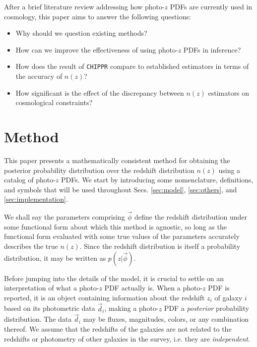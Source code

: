 \documentclass[iop]{emulateapj}
\newcommand{\chippr}{\texttt{CHIPPR} }
\begin{document}
After a brief literature review addressing how photo-$z$ PDFs are currently 
used in cosmology, this paper aims to answer the following questions:

\begin{itemize}
	\item Why should we question existing methods?
	\item How can we improve the effectiveness of using photo-$z$ PDFs in 
inference?
	\item How does the result of \chippr compare to established estimators 
in terms of the accuracy of $n(z)$?
	\item How significant is the effect of the discrepancy between $n(z)$ 
estimators on cosmological constraints?
\end{itemize}

\section{Method}
\label{sec:method}

This paper presents a mathematically consistent method for obtaining the 
posterior probability distribution over the redshift distribution $n(z)$ using 
a catalog of photo-$z$ PDFs.  We start by introducing some nomenclature, 
definitions, and symbols that will be used throughout Secs. \ref{sec:model}, 
\ref{sec:others}, and \ref{sec:implementation}.

We shall say the parameters comprising $\vec{\phi}$ define the redshift 
distribution under some functional form about which this method is agnostic, so 
long as the functional form evaluated with some true values of the parameters 
accurately describes the true $n(z)$.  Since the redshift distribution is 
itself a probability distribution, it may be written as $p(z | \vec{\phi})$.

Before jumping into the details of the model, it is crucial to settle on an 
interpretation of what a photo-$z$ PDF actually is.  When a photo-$z$ PDF is 
reported, it is an object containing information about the redshift $z_{i}$ of 
galaxy $i$ based on its photometric data $\vec{d}_{i}$, making a photo-$z$ PDF 
a \textit{posterior} probability distribution.  The data $\vec{d}_{i}$ may be 
fluxes, magnitudes, colors, or any combination thereof.  We assume that the 
redshifts of the galaxies are not related to the redshifts or photometry of 
other galaxies in the survey, i.e. they are \textit{independent}.
\end{document}
